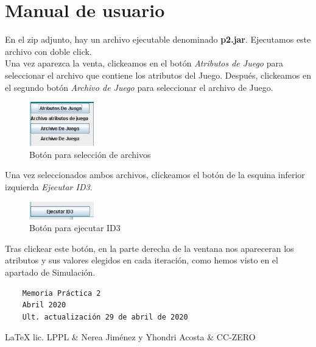 \documentclass[12pt]{article}
\begin{document}
\section{Manual de usuario}
En el zip adjunto, hay un archivo ejecutable denominado \textbf{p2.jar}. Ejecutamos este archivo con doble click.\\
Una vez aparezca la venta, clickeamos en el botón \textit{Atributos de Juego} para seleccionar el archivo que contiene los atributos del Juego. Después, clickeamos en el segundo botón \textit{Archivo de Juego} para seleccionar el archivo de Juego.
\begin{figure}[H]
    \centering
    \includegraphics[width=0.25\textwidth]{Captura.JPG}
    \caption{Botón para selección de archivos}
\end{figure}
Una vez seleccionados ambos archivos, clickeamos el botón de la esquina inferior izquierda \textit{Ejecutar ID3}.
\begin{figure}[H]
    \centering
    \includegraphics[width=0.25\textwidth]{2.JPG}
    \caption{Botón para ejecutar ID3}
\end{figure}
Tras clickear este botón, en la parte derecha de la ventana nos apareceran los atributos y sus valores elegidos en cada iteración, como hemos visto en el apartado de Simulación.
\newpage
\vspace*{\fill}
\begin{verbatim}
    Memoria Práctica 2
    Abril 2020
    Ult. actualización 29 de abril de 2020
\end{verbatim}
\LaTeX{} lic. LPPL \& Nerea Jiménez y Yhondri Acosta \& CC-ZERO
\doclicenseThis
\end{document}
